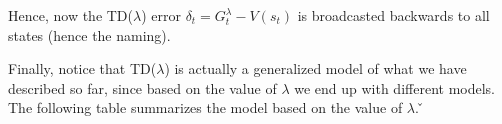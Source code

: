 Hence, now the TD($\lambda$) error $\delta_t = G_t^{\lambda} - V(s_t) $ is broadcasted backwards to all states (hence
the naming).

\vspace{10pt}


Finally, notice that TD($\lambda$) is actually a generalized model of what we have described so far, since based on
the value of $\lambda$ we end up with different models. The following table summarizes the model based on the value
of $\lambda$. \v

